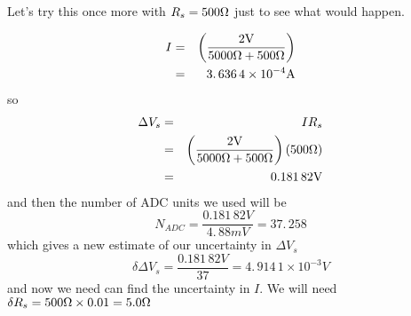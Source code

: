Let's try this once more with $R_{s}=500\unit{%
\Omega%
}$ just to see what would happen.

\begin{eqnarray*}
I &=&\left( \frac{2\unit{V}}{5000\unit{%
\Omega%
}+500\unit{%
\Omega%
}}\right) \\
&=&3.\,\allowbreak 636\,4\times 10^{-4}\unit{A}
\end{eqnarray*}%
so%
\begin{eqnarray*}
\Delta V_{s} &=&IR_{s} \\
&=&\left( \frac{2\unit{V}}{5000\unit{%
\Omega%
}+500\unit{%
\Omega%
}}\right) \left( 500\unit{%
\Omega%
}\right) \\
&=&0.181\,82\unit{V}
\end{eqnarray*}%
and then the number of ADC units we used will be 
\begin{equation*}
N_{ADC}=\frac{0.181\,82\unit{V}}{4.\,\allowbreak 88\unit{mV}}%
=37.\,\allowbreak 258
\end{equation*}%
which gives a new estimate of our uncertainty in $\Delta V_{s}$ 
\begin{equation*}
\delta \Delta V_{s}=\frac{0.181\,82\unit{V}}{37}=4.\,\allowbreak
914\,1\times 10^{-3}\unit{V}
\end{equation*}%
and now we need can find the uncertainty in $I.$ We will need $\delta
R_{s}=500\unit{%
\Omega%
}\times 0.01=\allowbreak 5.0\unit{%
\Omega%
}$

